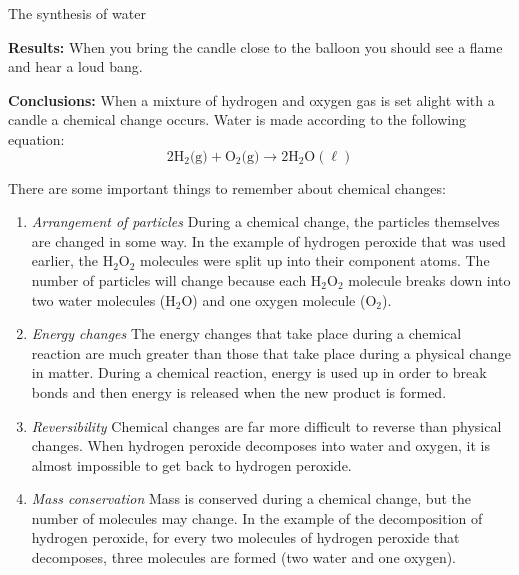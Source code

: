 \begin{g_experiment}{The synthesis of water}
        \par 
        \label{m38709*id63254}\noindent{}\textbf{Results:}\newline
When you bring the candle close to the balloon you should see a flame and hear a loud bang.\par 
        \label{m38709*id63302}\noindent{}\textbf{Conclusions:}\newline
When a mixture of hydrogen and oxygen gas is set alight with a candle a chemical change occurs. Water is made according to the following equation:
        \label{m38709*id63313}\nopagebreak\noindent{}
    \begin{equation*}
    2{\text{H}}_{2} \text{(g)} + {\text{O}}_{2}\text{(g)} \to 2\text{H}_{2}\text{O}(\ell)
      \end{equation*}   
\end{g_experiment}
      \label{m38709*id62865}There are some important things to remember about chemical changes:\par 
      \label{m38709*id62869}\begin{enumerate}[noitemsep, label=\textbf{\arabic*}. ] 
            \label{m38709*uid6}\item \textsl{Arrangement of particles}\newline
During a chemical change, the particles themselves are changed in some way. In the example of hydrogen peroxide that was used earlier, the $\text{H}_{2}\text{O}_{2}$ molecules were split up into their component atoms. The number of particles will change because each $\text{H}_{2}\text{O}_{2}$ molecule breaks down into two water molecules ($\text{H}_{2}\text{O}$) and one oxygen molecule ($\text{O}_{2}$).
\label{m38709*uid7}\item \textsl{Energy changes}\newline
The energy changes that take place during a chemical reaction are much greater than those that take place during a physical change in matter. During a chemical reaction, energy is used up in order to break bonds and then energy is released when the new product is formed. 
\label{m38709*uid8}\item \textsl{Reversibility}\newline
Chemical changes are far more difficult to reverse than physical changes. When hydrogen peroxide decomposes into water and oxygen, it is almost impossible to get back to hydrogen peroxide.
\item \textsl{Mass conservation}\newline
Mass is conserved during a chemical change, but the number of molecules may change. In the example of the decomposition of hydrogen peroxide, for every two molecules of hydrogen peroxide that decomposes, three molecules are formed (two water and one oxygen).
\end{enumerate}
